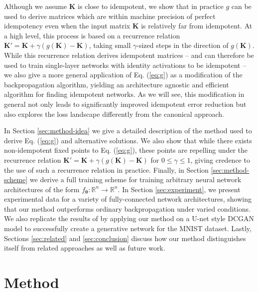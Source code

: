 \documentclass{article}
\theoremstyle{plain}
\theoremstyle{definition}
\theoremstyle{remark}
\newcommand{\vK}{\mathbf{K}}
\newcommand{\vtheta}{\bm{\theta}}
\begin{document}
Although we assume $\vK$ is close to idempotent, we show that in practice $g$ can be used to derive matrices which are within machine precision of perfect idempotency even when the input matrix $\vK$ is relatively far from idempotent. At a high level, this process is based on a recurrence relation ${\vK' = \vK + \gamma(g(\vK) - \vK)}$, taking small $\gamma$-sized steps in the direction of $g(\vK)$. While this recurrence relation derives idempotent matrices -- and can therefore be used to train single-layer networks with identity activations to be idempotent -- we also give a more general application of Eq. (\ref{eq:g}) as a modification of the backpropagation algorithm, yielding an architecture agnostic and efficient algorithm for finding idempotent networks. As we will see, this modification in general not only leads to significantly improved idempotent error reduction but also explores the loss landscape differently from the canonical approach.

In Section \ref{sec:method-idea} we give a detailed description of the method used to derive Eq. (\ref{eq:g}) and alternative solutions. We also show that while there exists non-idempotent fixed points to Eq. (\ref{eq:g}), these points are repelling under the recurrence relation ${\vK' = \vK + \gamma(g(\vK) - \vK)}$ for $0 \leq \gamma \leq 1$, giving credence to the use of such a recurrence relation in practice. Finally, in Section \ref{sec:method-scheme} we derive a full training scheme for training arbitrary neural network architectures of the form ${f_{\vtheta}: \mathbb{R}^n \to \mathbb{R}^n}$. In Section \ref{sec:experiment}, we present experimental data for a variety of fully-connected network architectures, showing that our method outperforms ordinary backpropagation under varied conditions. We also replicate the results of \citealt{shocher-ign} by applying our method on a U-net style DCGAN model to successfully create a generative network for the MNIST dataset. Lastly, Sections \ref{sec:related} and \ref{sec:conclusion} discuss how our method distinguishes itself from related approaches as well as future work.

\section{Method}
\label{sec:method}
\end{document}
